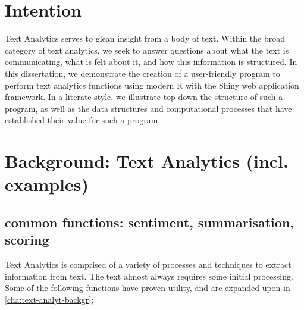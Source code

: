 \documentclass[11pt, a4paper, oneside]{report}
\begin{document}
\section{Intention}
\label{sec:intention}

Text Analytics serves to glean insight from a body of text. Within the
broad category of text analytics, we seek to answer questions about
what the text is communicating, what is felt about it, and how this
information is structured. In this dissertation, we demonstrate the
creation of a user-friendly program to perform text analytics
functions using modern R with the Shiny web application framework. In
a literate style, we illustrate top-down the structure of such a
program, as well as the data structures and computational processes
that have established their value for such a program.
  
\section{Background: Text Analytics (incl. examples)}
\label{sec:backgr-text-analyt}
\subsection{common functions: sentiment, summarisation, scoring}
Text Analytics is comprised of a variety of processes and techniques
to extract information from text. The text almost always requires some
initial processing. Some of the following functions have proven
utility, and are expanded upon in \autoref{cha:text-analyt-backgr};
\end{document}
